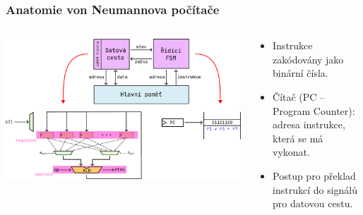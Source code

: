\documentclass[aspectratio=169,11pt,svgnames]{beamer}
\begin{document}
\begin{frame}

 \frametitle{Anatomie von Neumannova počítače}
 \begin{columns}[T]
  \begin{column}{.6\textwidth}
   \vspace*{-1em}
   \begin{center}
    \includegraphics[width=1.2\textwidth]{anatomy-4.pdf}
   \end{center}
  \end{column}
  \begin{column}{.39\textwidth}
   \begin{itemize}[label=\textbullet]
    \item \alert{Instrukce} zakódovány jako binární čísla.\pause
    \item \alert{Čítač} (PC -- Program Counter): adresa instrukce, která se má
     vykonat.\pause
   \end{itemize}
   \vspace{3em}
   \begin{itemize}[label=\textbullet]
    \item Postup pro překlad instrukcí do signálů pro datovou cestu.
   \end{itemize}
  \end{column}
 \end{columns}
\end{frame}
\end{document}
